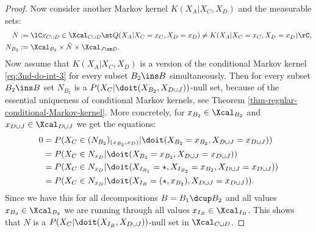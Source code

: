 \begin{Cor}[Do-calculus]
\begin{proof}
Now consider another Markov kernel $K(X_A|X_C,X_D)$ and the measurable sets:
\begin{align*}
    N &:= \lC x_{C \cup D} \in \Xcal_{C \cup D} \st Q(X_A|X_C=x_C,X_D=x_D) \neq K(X_A|X_C=x_C,X_D=x_D)  \rC,\\
    N_{B_2} &:= \Xcal_{B_2} \times \tilde N \times \Xcal_{J \sm D}.
\end{align*}
Now assume that $K(X_A|X_C,X_D)$ is a version of the conditional Markov kernel \ref{eq:3nd-do-int-3} 
for every subset $B_2 \ins B$ simultaneously. 
Then for every subset $B_2 \ins B$ set $N_{B_2}$ is a
$P(X_C|\doit(X_{B_2},X_{D\cup J}))$-null set, because of the essential uniqueness of conditional Markov kernels, see Theorem \ref{thm-regular-conditional-Markov-kernel}. More concretely, for $x_{B_2} \in \Xcal_{B_2}$ 
and $x_{D \cup J} \in \Xcal_{D \cup J}$ we get the equations:
\begin{align*}
    0 &=P(X_C \in (N_{B_2})_{(x_{B_2},x_D)} |\doit(X_{B_2}=x_{B_2},X_{D\cup J}=x_{D \cup J})) \\
      &=P(X_C \in N_{x_D} |\doit(X_{B_2}=x_{B_2},X_{D\cup J}=x_{D \cup J}))\\
      &=P(X_C \in N_{x_D} |\doit(X_{I_{B_1}}=\star, X_{I_{B_2}}=x_{B_2},X_{D\cup J}=x_{D \cup J}))\\
      &=P(X_C \in N_{x_D} |\doit(X_{I_B}=(\star,x_{B_2}),X_{D\cup J}=x_{D \cup J})).
\end{align*}
Since we have this for all decompositions $B=B_1 \dcup B_2$ and all values $x_{B_2} \in \Xcal_{B_2}$ 
we are running through all values $x_{I_B} \in \Xcal_{I_B}$. 
This shows that $N$ is a $P(X_C|\doit(X_{I_B},X_{D\cup J}))$-null set in $\Xcal_{C \cup D}$.
\end{proof}
\end{Cor}




